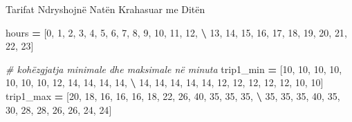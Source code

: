 \documentclass[
  ignorenonframetext,
]{beamer}
\newenvironment{Shaded}{\begin{snugshade}}{\end{snugshade}}
\newcommand{\CommentTok}[1]{\textcolor[rgb]{0.56,0.35,0.01}{\textit{#1}}}
\newcommand{\DecValTok}[1]{\textcolor[rgb]{0.00,0.00,0.81}{#1}}
\newcommand{\NormalTok}[1]{#1}
\newcommand{\OperatorTok}[1]{\textcolor[rgb]{0.81,0.36,0.00}{\textbf{#1}}}
\begin{document}
\begin{frame}[fragile]{Tarifat Ndryshojnë Natën Krahasuar me Ditën}
\protect\hypertarget{tarifat-ndryshojnuxeb-natuxebn-krahasuar-me-dituxebn-16}{}

\begin{Shaded}
\begin{Highlighting}[]
\NormalTok{hours }\OperatorTok{=}\NormalTok{ [}\DecValTok{0}\NormalTok{, }\DecValTok{1}\NormalTok{, }\DecValTok{2}\NormalTok{, }\DecValTok{3}\NormalTok{, }\DecValTok{4}\NormalTok{, }\DecValTok{5}\NormalTok{, }\DecValTok{6}\NormalTok{, }\DecValTok{7}\NormalTok{, }\DecValTok{8}\NormalTok{, }\DecValTok{9}\NormalTok{, }\DecValTok{10}\NormalTok{, }\DecValTok{11}\NormalTok{, }\DecValTok{12}\NormalTok{, }\OperatorTok{\textbackslash{}}
         \DecValTok{13}\NormalTok{, }\DecValTok{14}\NormalTok{, }\DecValTok{15}\NormalTok{, }\DecValTok{16}\NormalTok{, }\DecValTok{17}\NormalTok{, }\DecValTok{18}\NormalTok{, }\DecValTok{19}\NormalTok{, }\DecValTok{20}\NormalTok{, }\DecValTok{21}\NormalTok{, }\DecValTok{22}\NormalTok{, }\DecValTok{23}\NormalTok{]}

\CommentTok{\# kohëzgjatja minimale dhe maksimale në minuta}
\NormalTok{trip1\_min }\OperatorTok{=}\NormalTok{ [}\DecValTok{10}\NormalTok{, }\DecValTok{10}\NormalTok{, }\DecValTok{10}\NormalTok{, }\DecValTok{10}\NormalTok{, }\DecValTok{10}\NormalTok{, }\DecValTok{10}\NormalTok{, }\DecValTok{10}\NormalTok{, }\DecValTok{12}\NormalTok{, }\DecValTok{14}\NormalTok{, }\DecValTok{14}\NormalTok{, }\DecValTok{14}\NormalTok{, }\DecValTok{14}\NormalTok{, }\OperatorTok{\textbackslash{}}
             \DecValTok{14}\NormalTok{, }\DecValTok{14}\NormalTok{, }\DecValTok{14}\NormalTok{, }\DecValTok{14}\NormalTok{, }\DecValTok{14}\NormalTok{, }\DecValTok{12}\NormalTok{, }\DecValTok{12}\NormalTok{, }\DecValTok{12}\NormalTok{, }\DecValTok{12}\NormalTok{, }\DecValTok{12}\NormalTok{, }\DecValTok{10}\NormalTok{, }\DecValTok{10}\NormalTok{]}
\NormalTok{trip1\_max }\OperatorTok{=}\NormalTok{ [}\DecValTok{20}\NormalTok{, }\DecValTok{18}\NormalTok{, }\DecValTok{16}\NormalTok{, }\DecValTok{16}\NormalTok{, }\DecValTok{16}\NormalTok{, }\DecValTok{18}\NormalTok{, }\DecValTok{22}\NormalTok{, }\DecValTok{26}\NormalTok{, }\DecValTok{40}\NormalTok{, }\DecValTok{35}\NormalTok{, }\DecValTok{35}\NormalTok{, }\DecValTok{35}\NormalTok{, }\OperatorTok{\textbackslash{}}
             \DecValTok{35}\NormalTok{, }\DecValTok{35}\NormalTok{, }\DecValTok{35}\NormalTok{, }\DecValTok{40}\NormalTok{, }\DecValTok{35}\NormalTok{, }\DecValTok{30}\NormalTok{, }\DecValTok{28}\NormalTok{, }\DecValTok{28}\NormalTok{, }\DecValTok{26}\NormalTok{, }\DecValTok{26}\NormalTok{, }\DecValTok{24}\NormalTok{, }\DecValTok{24}\NormalTok{]}


\end{Highlighting}
\end{Shaded}
\end{frame}
\end{document}
